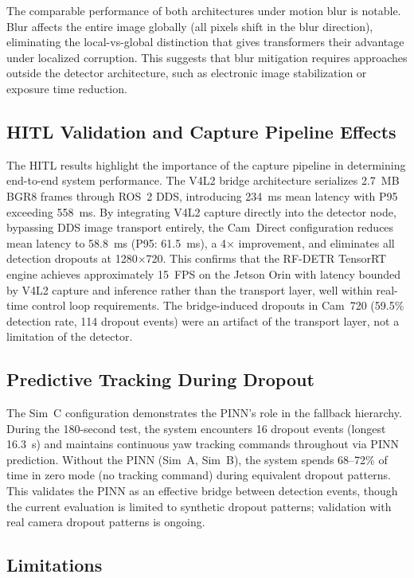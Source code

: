 \documentclass[11pt,letterpaper]{article}
\begin{document}
The comparable performance of both architectures under motion blur is notable. Blur affects the entire image globally (all pixels shift in the blur direction), eliminating the local-vs-global distinction that gives transformers their advantage under localized corruption. This suggests that blur mitigation requires approaches outside the detector architecture, such as electronic image stabilization or exposure time reduction.

\subsection{HITL Validation and Capture Pipeline Effects}

The HITL results highlight the importance of the capture pipeline in determining end-to-end system performance. The V4L2 bridge architecture serializes 2.7~MB BGR8 frames through ROS~2 DDS, introducing 234~ms mean latency with P95 exceeding 558~ms. By integrating V4L2 capture directly into the detector node, bypassing DDS image transport entirely, the Cam~Direct configuration reduces mean latency to 58.8~ms (P95: 61.5~ms), a 4$\times$ improvement, and eliminates all detection dropouts at 1280$\times$720. This confirms that the RF-DETR TensorRT engine achieves approximately 15~FPS on the Jetson Orin with latency bounded by V4L2 capture and inference rather than the transport layer, well within real-time control loop requirements. The bridge-induced dropouts in Cam~720 (59.5\% detection rate, 114 dropout events) were an artifact of the transport layer, not a limitation of the detector.

\subsection{Predictive Tracking During Dropout}

The Sim~C configuration demonstrates the PINN's role in the fallback hierarchy. During the 180-second test, the system encounters 16 dropout events (longest 16.3~s) and maintains continuous yaw tracking commands throughout via PINN prediction. Without the PINN (Sim~A, Sim~B), the system spends 68--72\% of time in zero mode (no tracking command) during equivalent dropout patterns. This validates the PINN as an effective bridge between detection events, though the current evaluation is limited to synthetic dropout patterns; validation with real camera dropout patterns is ongoing.

\subsection{Limitations}
\end{document}
